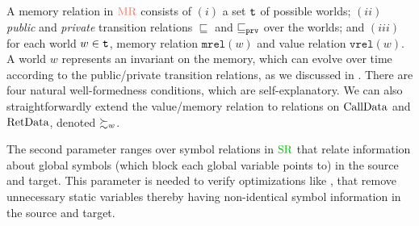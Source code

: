 A memory relation in $\MREL$ consists of $(i)$ a set $\texttt{t}$ of possible worlds; $(ii)$ \emph{public}
and \emph{private} transition relations $\sqsubseteq$ and $\sqsubseteq_{\texttt{prv}}$ over the worlds;
and $(iii)$ for each world $w \in \texttt{t}$, memory relation $\texttt{mrel}(w)$ and
value relation $\texttt{vrel}(w)$.  A world $w$ represents an invariant on the memory, which
can evolve over time according to the public/private transition relations,
as we discussed in .
There are four natural well-formedness conditions, which are self-explanatory.
We can also straightforwardly extend the value/memory relation to relations on $\textrm{CallData}$ and $\textrm{RetData}$, denoted $\succsim_{w}$.


The second parameter ranges over symbol relations in $\SREL$ that
relate information about global symbols (\eg which block each global
variable points to) in the source and target.  This parameter is
needed to verify optimizations like ,
 that remove unnecessary static variables thereby
having non-identical symbol information in the source and target.

